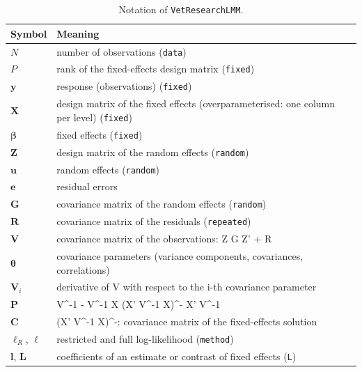 \begin{longtable}{>{\raggedright\arraybackslash}p{}>{\raggedright\arraybackslash}p{}}
\caption{Notation of \texttt{VetResearchLMM}.}\\
\toprule
Symbol & Meaning\\
\midrule
\endhead
$N$ & number of observations (\texttt{data})\\
$P$ & rank of the fixed-effects design matrix (\texttt{fixed})\\
$\mathbf{y}$ & response (observations) (\texttt{fixed})\\
$\mathbf{X}$ & design matrix of the fixed effects (overparameterised: one column per level) (\texttt{fixed})\\
$\boldsymbol{\beta}$ & fixed effects (\texttt{fixed})\\
$\mathbf{Z}$ & design matrix of the random effects (\texttt{random})\\
$\mathbf{u}$ & random effects (\texttt{random})\\
$\mathbf{e}$ & residual errors\\
$\mathbf{G}$ & covariance matrix of the random effects (\texttt{random})\\
$\mathbf{R}$ & covariance matrix of the residuals (\texttt{repeated})\\
$\mathbf{V}$ & covariance matrix of the observations: Z G Z' + R\\
$\boldsymbol{\theta}$ & covariance parameters (variance components, covariances, correlations)\\
$\mathbf{V}_i$ & derivative of V with respect to the i-th covariance parameter\\
$\mathbf{P}$ & V^-1 - V^-1 X (X' V^-1 X)^- X' V^-1\\
$\mathbf{C}$ & (X' V^-1 X)^-: covariance matrix of the fixed-effects solution\\
$\ell_R$, $\ell$ & restricted and full log-likelihood (\texttt{method})\\
$\mathbf{l}$, $\mathbf{L}$ & coefficients of an estimate or contrast of fixed effects (\texttt{L})\\

\end{longtable}
